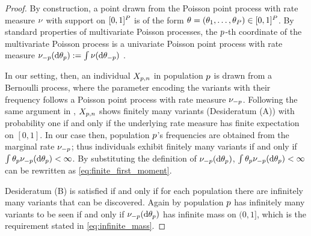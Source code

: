 \begin{proof}
	By construction, a point drawn from the Poisson point process with rate measure $\nu$ with support on $[0,1]^P$ is of the form 
	$\vecvariantfreq{} = (\variantfreqperpop{1}, \ldots,\theta_\numpops) \in [0,1]^\numpops$. 
	By standard properties of multivariate Poisson processes, the $p$-th coordinate of the multivariate Poisson process is a univariate Poisson point process with rate measure $\levync_{-\popidx} (\de \variantfreqperpop{\popidx}) := \int \levync(\de\vecvariantfreq{-\popidx})$ \citep[Mapping theorem,][ch. 2.3]{kingman1992poisson}.

	In our setting, then, an individual $X_{p,n}$ in population $p$ is drawn from a Bernoulli process, where the parameter encoding the variants with their frequency follows a Poisson point process with rate measure $\nu_{-p}$. Following the same argument in \citet[][Section 2.3]{Broderick2018}, $X_{p,n}$ shows finitely many variants (Desideratum (A)) with probability one if and only if the underlying rate measure has finite expectation on $[0,1]$. In our case then, population $p$'s frequencies are obtained from the marginal rate $\nu_{-p}$; thus individuals exhibit finitely many variants if and only if $\int\theta_p \nu_{-p}(\mathrm{d} \theta_{p}) < \infty$.
	By substituting the definition of $\nu_{-p}(\mathrm{d} \theta_{p})$, $\int\theta_p \nu_{-p}(\mathrm{d} \theta_{p}) < \infty$ can be rewritten as \cref{eq:finite_first_moment}.
	 

	Desideratum (B) is satisfied if and only if for each population there are infinitely many variants that can be discovered. Again by \citet[][Section 2.3]{Broderick2018} population $p$ has infinitely many variants to be seen if and only if $\nu_{-p} (\mathrm{d} \theta_{p})$ has infinite mass on $(0,1]$, which is the requirement stated in \cref{eq:infinite_mass}.  
\end{proof}

